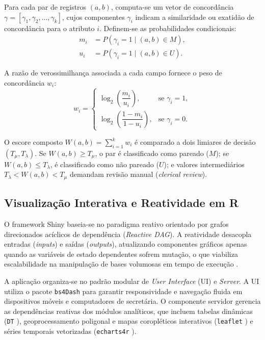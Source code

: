 \documentclass[sigconf, nonacm, screen, language=portuguese, language=spanish, language={main=english}]{acmart}
\begin{document}
Para cada par de registros $(a, b)$, computa-se um vetor de concordância $\gamma = [\gamma_1, \gamma_2, \dots, \gamma_k]$, cujos componentes $\gamma_i$ indicam a similaridade ou exatidão de concordância para o atributo $i$. Definem-se as probabilidades condicionais:
\begin{align}
m_i &= P(\gamma_i = 1 \mid (a,b) \in M), \\
u_i &= P(\gamma_i = 1 \mid (a,b) \in U).
\end{align}

A razão de verossimilhança associada a cada campo fornece o peso de concordância $w_i$:
\begin{equation}
w_i = 
\begin{cases}
\log_2 \left( \dfrac{m_i}{u_i} \right), & \text{se } \gamma_i = 1, \\[8pt]
\log_2 \left( \dfrac{1 - m_i}{1 - u_i} \right), & \text{se } \gamma_i = 0.
\end{cases}
\end{equation}

O escore composto $W(a,b) = \sum_{i=1}^k w_i$ é comparado a dois limiares de decisão $(T_{\mu}, T_{\lambda})$. Se $W(a,b) \ge T_{\mu}$, o par é classificado como pareado ($M$); se $W(a,b) \le T_{\lambda}$, é classificado como não pareado ($U$); e valores intermediários $T_{\lambda} < W(a,b) < T_{\mu}$ demandam revisão manual (\textit{clerical review}).

\subsection{Visualização Interativa e Reatividade em R}
O framework Shiny baseia-se no paradigma reativo orientado por grafos direcionados acíclicos de dependência (\textit{Reactive DAG}). A reatividade desacopla entradas (\textit{inputs}) e saídas (\textit{outputs}), atualizando componentes gráficos apenas quando as variáveis de estado dependentes sofrem mutação, o que viabiliza escalabilidade na manipulação de bases volumosas em tempo de execução \cite{shiny2024}.

A aplicação organiza-se no padrão modular de \textit{User Interface} (UI) e \textit{Server}. A UI utiliza o pacote \texttt{bs4Dash} para garantir responsividade e navegação fluida em dispositivos móveis e computadores de secretária. O componente servidor gerencia as dependências reativas dos módulos analíticos, que incluem tabelas dinâmicas (\texttt{DT} \cite{dt2024}), geoprocessamento poligonal e mapas coropléticos interativos (\texttt{leaflet} \cite{leaflet2024}) e séries temporais vetorizadas (\texttt{echarts4r} \cite{echarts4r2023}).
\end{document}
